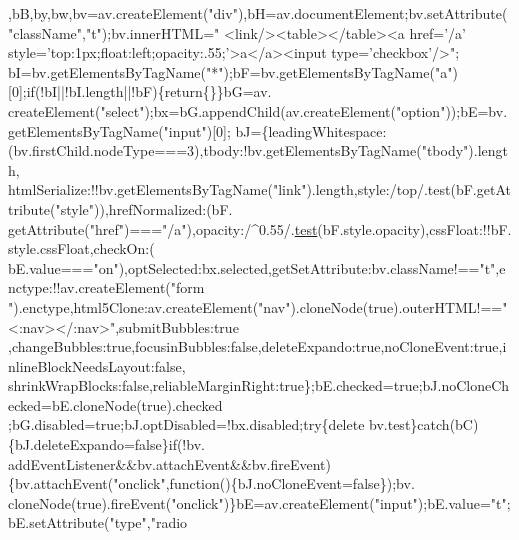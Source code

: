 \begin{DoxyCode}
      ,bB,by,bw,bv=av.createElement(\textcolor{stringliteral}{"div"}),bH=av.documentElement;bv.setAttribute(\textcolor{stringliteral}{"className"},\textcolor{stringliteral}{"t"});bv.innerHTML=\textcolor{stringliteral}{"  
       <link/><table></table><a href='/a' style='top:1px;float:left;opacity:.55;'>a</a><input type='checkbox'/>"};
      bI=bv.getElementsByTagName(\textcolor{stringliteral}{"*"});bF=bv.getElementsByTagName(\textcolor{stringliteral}{"a"})[0];\textcolor{keywordflow}{if}(!bI||!bI.length||!bF)\{\textcolor{keywordflow}{return}\{\}\}bG=av.
      createElement(\textcolor{stringliteral}{"select"});bx=bG.appendChild(av.createElement(\textcolor{stringliteral}{"option"}));bE=bv.getElementsByTagName(\textcolor{stringliteral}{"input"})[0];
      bJ=\{leadingWhitespace:(bv.firstChild.nodeType===3),tbody:!bv.getElementsByTagName(\textcolor{stringliteral}{"tbody"}).length,
      htmlSerialize:!!bv.getElementsByTagName(\textcolor{stringliteral}{"link"}).length,style:/top/.test(bF.getAttribute(\textcolor{stringliteral}{"style"})),hrefNormalized:(bF.
      getAttribute(\textcolor{stringliteral}{"href"})===\textcolor{stringliteral}{"/a"}),opacity:/^0.55/.\hyperlink{inv__mpu_8c_a1e8f8b1ef7fb2c429e1ce7c2f9985530}{test}(bF.style.opacity),cssFloat:!!bF.style.cssFloat,checkOn:(
      bE.value===\textcolor{stringliteral}{"on"}),optSelected:bx.selected,getSetAttribute:bv.className!==\textcolor{stringliteral}{"t"},enctype:!!av.createElement(\textcolor{stringliteral}{"form
      "}).enctype,html5Clone:av.createElement(\textcolor{stringliteral}{"nav"}).cloneNode(\textcolor{keyword}{true}).outerHTML!==\textcolor{stringliteral}{"<:nav></:nav>"},submitBubbles:\textcolor{keyword}{true}
      ,changeBubbles:\textcolor{keyword}{true},focusinBubbles:\textcolor{keyword}{false},deleteExpando:\textcolor{keyword}{true},noCloneEvent:\textcolor{keyword}{true},inlineBlockNeedsLayout:\textcolor{keyword}{false},
      shrinkWrapBlocks:\textcolor{keyword}{false},reliableMarginRight:\textcolor{keyword}{true}\};bE.checked=\textcolor{keyword}{true};bJ.noCloneChecked=bE.cloneNode(\textcolor{keyword}{true}).checked
      ;bG.disabled=\textcolor{keyword}{true};bJ.optDisabled=!bx.disabled;\textcolor{keywordflow}{try}\{\textcolor{keyword}{delete} bv.test\}\textcolor{keywordflow}{catch}(bC)\{bJ.deleteExpando=\textcolor{keyword}{false}\}\textcolor{keywordflow}{if}(!bv.
      addEventListener&&bv.attachEvent&&bv.fireEvent)\{bv.attachEvent(\textcolor{stringliteral}{"onclick"},\textcolor{keyword}{function}()\{bJ.noCloneEvent=\textcolor{keyword}{false}\});bv.
      cloneNode(\textcolor{keyword}{true}).fireEvent(\textcolor{stringliteral}{"onclick"})\}bE=av.createElement(\textcolor{stringliteral}{"input"});bE.value=\textcolor{stringliteral}{"t"};bE.setAttribute(\textcolor{stringliteral}{"type"},\textcolor{stringliteral}{"radio
}
\end{DoxyCode}
